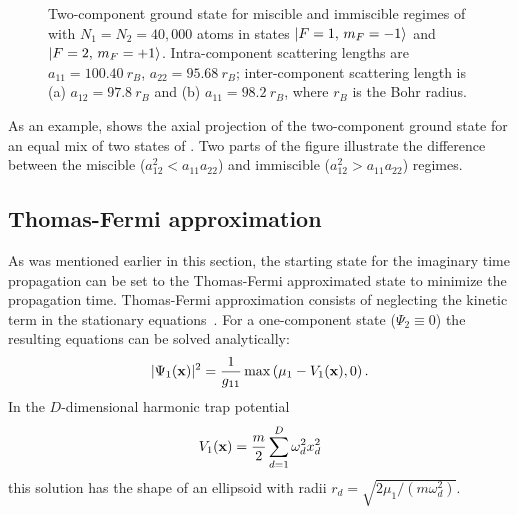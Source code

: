 \begin{figure}
\begin{center}
\end{center}
\caption{Two-component ground state for miscible and immiscible regimes of \Rb{}  with $N_1 = N_2 = 40,000$ atoms in states ${\mbox{\ensuremath{\vert F=1,\, m_F=-1 \rangle}}}$ and ${\mbox{\ensuremath{\vert F=2,\, m_F=+1 \rangle}}}$.
Intra-component scattering lengths are $a_{11} = 100.40\ r_B$, $a_{22} = 95.68\ r_B$; inter-component scattering length is (a) $a_{12} = 97.8\ r_B$ and (b) $a_{11} = 98.2\ r_B$, where $r_B$ is the Bohr radius.}
\label{fig:bec-noise:mean-field:two-comp-gs}
\end{figure}

As an example,  shows the axial projection of the two-component ground state for an equal mix of two states of \Rb{} .
Two parts of the figure illustrate the difference between the miscible ($a_{12}^2 < a_{11} a_{22}$) and immiscible ($a_{12}^2 > a_{11} a_{22}$) regimes.


\subsection{Thomas-Fermi approximation}

As was mentioned earlier in this section, the starting state for the imaginary time propagation can be set to the Thomas-Fermi approximated state to minimize the propagation time.
Thomas-Fermi approximation consists of neglecting the kinetic term in the stationary equations~.
For a one-component state ($\Psi_2 \equiv 0$) the resulting equations can be solved analytically:
\begin{equation}
\label{eqn:bec-noise:mean-field:tf-gs}
	| \Psi_1(\mathbf{x}) |^2 = \frac{1}{g_{11}} \max \left( \mu_1 - V_1(\mathbf{x}), 0 \right).
\end{equation}
In the $D$-dimensional harmonic trap potential
\begin{equation}
\label{eqn:bec-noise:mean-field:trap-potential}
	V_1(\mathbf{x}) = \frac{m}{2} \sum_{d=1}^D \omega_d^2 x_d^2
\end{equation}
this solution has the shape of an ellipsoid with radii $r_d = \sqrt{2\mu_1 / (m \omega_d^2)}$.


